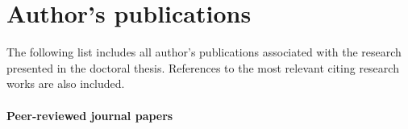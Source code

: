 \documentclass{ctuthesis}\usepackage[]{graphicx}\usepackage[]{color}
\begin{document}
\FloatBarrier









\FloatBarrier
{}
      
    
        
        
        \setcounter{chapter}{11}
        \small
         
        
        


\setcounter{chapter}{12}

\chapter*{Author's publications}    \label{myPubl}

The following list includes all author's publications associated with the research presented in the doctoral thesis. References to the most relevant citing research works are also included.

\subsubsection*{Peer-reviewed journal papers}
\end{document}
